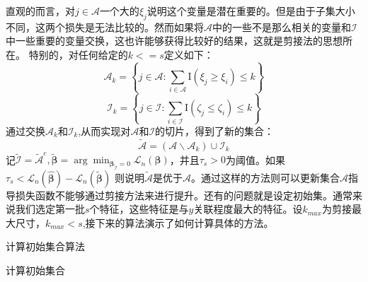 \documentclass[
]{ctexart}
\begin{document}
直观的而言，对\(j \in \mathcal{A}\)一个大的\(\xi_{j}\)说明这个变量是潜在重要的。但是由于子集大小不同，这两个损失是无法比较的。然而如果将\(\mathcal{A}\)中的一些不是那么相关的变量和\(\mathcal{I}\)中一些重要的变量交换，这也许能够获得比较好的结果，这就是剪接法的思想所在。
特别的，对任何给定的\(k <= s\)定义如下： \[
\mathcal{A}_{k}=\left\{j \in \mathcal{A}: \sum_{i \in \mathcal{A}} \mathrm{I}\left(\xi_{j} \geq \xi_{i}\right) \leq k\right\}
\] \[
\mathcal{I}_{k}=\left\{j \in \mathcal{I}: \sum_{i \in \mathcal{I}} \mathrm{I}\left(\zeta_{j} \leq \zeta_{i}\right) \leq k\right\}
\]
通过交换\(\mathcal{A}_{k}\)和\(\mathcal{I}_{k}\),从而实现对\(\mathcal{A}\)和\(\mathcal{I}\)的切片，得到了新的集合：
\[
\tilde{\mathcal{A}}=\left(\mathcal{A} \backslash \mathcal{A}_{k}\right) \cup \mathcal{I}_{k}
\]
记\(\tilde{\mathcal{I}}=\tilde{\mathcal{A}}^{c}, \tilde{\boldsymbol{\beta}}=\arg \min _{\boldsymbol{\beta}_{\tilde{\mathcal{I}}}=0} \mathcal{L}_{n}(\boldsymbol{\beta})\)，并且\(\tau_{s}>0\)为阈值。如果\(\tau_{s} < \mathcal{L}_{n}(\hat{\boldsymbol{\beta}})-\mathcal{L}_{n}(\tilde{\boldsymbol{\beta}})\)
则说明\(\tilde{\mathcal{A}}\)是优于\(\mathcal{A}\)。通过这样的方法则可以更新集合\(\mathcal{A}\)指导损失函数不能够通过剪接方法来进行提升。还有的问题就是设定初始集。通常来说我们选定第一批\(s\)个特征，这些特征是与\(y\)关联程度最大的特征。设\(k_{max}\)为剪接最大尺寸，\(k_{max}<s\),接下来的算法演示了如何计算具体的方法。

\begin{algorithm}[H]
\caption{计算初始集合算法}%
计算初始集合\; %
\end{algorithm}
\end{document}
